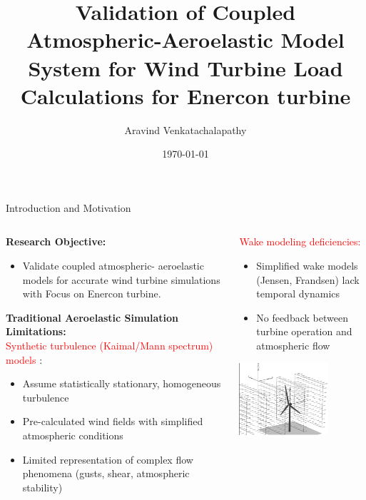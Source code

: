 \documentclass[aspectratio=1610]{beamer}
\title{Validation of Coupled Atmospheric-Aeroelastic Model System for Wind Turbine Load Calculations for Enercon turbine}
\author{Aravind Venkatachalapathy}
\institute{Enercon}
\date{\today}
\begin{document}
\frame{\titlepage}

\begin{frame}{Introduction and Motivation}
    \begin{columns}
        \begin{column}{0.6\textwidth}
            \textbf{Research Objective:}
            \begin{itemize}
                \item Validate coupled atmospheric- aeroelastic models for accurate wind turbine simulations with Focus on Enercon turbine.
            \end{itemize}
            \vspace{5mm}
            \textbf{Traditional Aeroelastic Simulation Limitations:}\\
             \textcolor{red}{Synthetic turbulence (Kaimal/Mann spectrum) models} :
                \begin{itemize}
                    \item Assume statistically stationary, homogeneous turbulence
                    \item Pre-calculated wind fields with simplified atmospheric conditions
                    \item Limited representation of complex flow phenomena (gusts, shear, atmospheric stability)
                \end{itemize}
        \end{column}
        \begin{column}{0.4\textwidth}
                \textcolor{red}{Wake modeling deficiencies:}
                \begin{itemize}
                    \item Simplified wake models (Jensen, Frandsen) lack temporal dynamics
                    \item No feedback between turbine operation and atmospheric flow
                \end{itemize}
            
            \vfill
            \begin{center}
              \includegraphics[width=0.7\textwidth]{wind.png}  
            \end{center}
            
            
        \end{column}
    \end{columns}
\end{frame}
\end{document}
